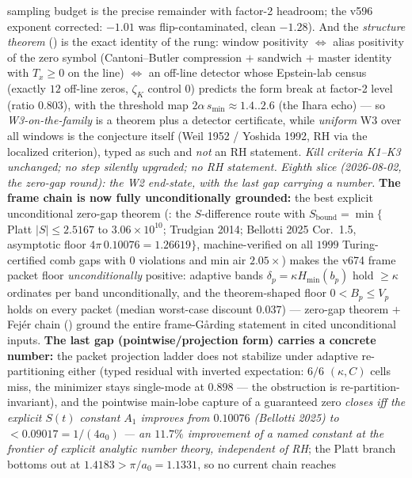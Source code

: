 \documentclass[11pt,a4paper]{article}
\begin{document}
sampling budget is the precise remainder with factor-2 headroom;
the v596 exponent corrected: $-1.01$ was flip-contaminated, clean
$-1.28$).  And the \emph{structure theorem}
() is the exact identity of
the rung: window positivity $\Leftrightarrow$ alias positivity of
the zero symbol (Cantoni--Butler compression $+$ sandwich $+$
master identity with $T_x\ge0$ on the line) $\Leftrightarrow$ an
off-line detector whose Epstein-lab census (exactly $12$ off-line
zeros, $\zeta_K$ control $0$) predicts the form break at factor-2
level (ratio $0.803$), with the threshold map
$2\alpha\,s_{\min}\approx1.4..2.6$ (the Ihara echo) --- so
\emph{W3-on-the-family} is a theorem plus a detector certificate,
while \emph{uniform} W3 over all windows is the conjecture itself
(Weil 1952 / Yoshida 1992, RH via the localized criterion), typed
as such and \emph{not} an RH statement.  \emph{Kill criteria K1--K3
unchanged; no step silently upgraded; no RH statement.}
\emph{Eighth slice (2026-08-02, the zero-gap round): the W2
end-state, with the last gap carrying a number.}  \textbf{The frame
chain is now fully unconditionally grounded:} the best explicit
unconditional zero-gap theorem (:
the $S$-difference route with $S_{\mathrm{bound}}=\min\{$Platt
$|S|\le2.5167$ to $3.06\times10^{10}$; Trudgian 2014; Bellotti 2025
Cor.~1.5, asymptotic floor $4\pi\,0.10076=1.26619\}$,
machine-verified on all $1999$ Turing-certified comb gaps with $0$
violations and min air $2.05\times$) makes the v674 frame packet
floor \emph{unconditionally} positive: adaptive bands
$\delta_p=\kappa H_{\min}(b_p)$ hold $\ge\kappa$ ordinates per band
unconditionally, and the theorem-shaped floor $0<B_p\le V_p$ holds on
every packet (median worst-case discount $0.037$) --- zero-gap
theorem $+$ Fej\'er chain () ground the
entire frame-G\aa rding statement in cited unconditional inputs.
\textbf{The last gap (pointwise/projection form) carries a concrete
number:} the packet projection ladder does not stabilize under
adaptive re-partitioning either (typed residual with inverted
expectation: $6/6$ $(\kappa,C)$ cells miss, the minimizer stays
single-mode at $0.898$ --- the obstruction is
re-partition-invariant), and the pointwise main-lobe capture of a
guaranteed zero \emph{closes iff the explicit $S(t)$ constant $A_1$
improves from $0.10076$ (Bellotti 2025) to $<0.09017=1/(4a_0)$
--- an $11.7\%$ improvement of a named constant at the frontier of
explicit analytic number theory, independent of RH}; the Platt branch
bottoms out at $1.4183>\pi/a_0=1.1331$, so no current chain reaches
\end{document}
